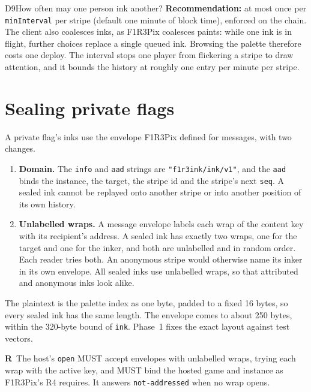\documentclass[11pt,a4paper]{article}
\newcommand{\code}[1]{\texttt{#1}}
\newcommand{\MUST}{{\fontsize{0.82em}{1em}\selectfont MUST}}
\newcounter{req}
\newcommand{\req}[1]{\refstepcounter{req}\label{#1}\textbf{R\thereq}}
\begin{document}
\begin{decision}{D9}{How often may one person ink another?}
\textbf{Recommendation:} at most once per \code{minInterval} per stripe (default one minute of
block time), enforced on the chain. The client also coalesces inks, as F1R3Pix coalesces paints:
while one ink is in flight, further choices replace a single queued ink. Browsing the palette
therefore costs one deploy. The interval stops one player from flickering a stripe to draw
attention, and it bounds the history at roughly one entry per minute per stripe.
\end{decision}

\section{Sealing private flags}\label{sec:sealing}

A private flag's inks use the envelope F1R3Pix defined for messages, with two changes.

\begin{enumerate}[leftmargin=1.4em,itemsep=2pt]
\item \textbf{Domain.} The \code{info} and \code{aad} strings are \code{"f1r3ink/ink/v1"}, and the
  \code{aad} binds the instance, the target, the stripe id and the stripe's next \code{seq}. A
  sealed ink cannot be replayed onto another stripe or into another position of its own history.
\item \textbf{Unlabelled wraps.} A message envelope labels each wrap of the content key with its
  recipient's address. A sealed ink has exactly two wraps, one for the target and one for the
  inker, and both are unlabelled and in random order. Each reader tries both. An anonymous stripe
  would otherwise name its inker in its own envelope. All sealed inks use unlabelled wraps, so
  that attributed and anonymous inks look alike.
\end{enumerate}

The plaintext is the palette index as one byte, padded to a fixed 16 bytes, so every sealed ink
has the same length. The envelope comes to about 250 bytes, within the 320-byte bound of
\code{ink}. Phase~1 fixes the exact layout against test vectors.

\req{r:open-unlabelled}~The host's \code{open} \MUST{} accept envelopes with unlabelled wraps,
trying each wrap with the active key, and \MUST{} bind the hosted game and instance as F1R3Pix's
R4 requires. It answers \code{not-addressed} when no wrap opens.
\end{document}
